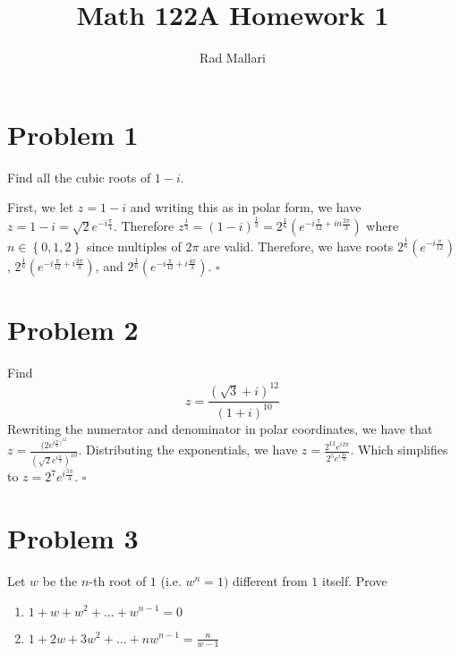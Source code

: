 \documentclass[12pt]{article}
\title{Math 122A Homework 1}
\author{Rad Mallari}
\newcommand{\set}[1]{\left\{ #1\right\}}
\newenvironment{proof}{\noindent{\bf Proof.}}{\hfill $\square$\medskip}
\begin{document}
\maketitle

\section{Problem 1}
Find all the cubic roots of $1-i$.

\begin{proof}
First, we let $z=1-i$ and writing this as in polar form, we have $z=1-i=\sqrt{2}e^{-i\frac{\pi}{4}}$. Therefore $z^\frac{1}{3}=(1-i)^{\frac{1}{3}}=2^{\frac{1}{6}}(e^{-i\frac{\pi}{12}+in\frac{2\pi}{3}})$ where $n\in\set{0,1,2}$ since multiples of $2\pi$ are valid. Therefore, we have roots
$2^{\frac{1}{6}}(e^{-i\frac{\pi}{12}})$,
$2^{\frac{1}{6}}(e^{-i\frac{\pi}{12}+i\frac{2\pi}{3}})$, and $2^{\frac{1}{6}}(e^{-i\frac{\pi}{12}+i\frac{4\pi}{3}})$.
\end{proof}


\section{Problem 2}
Find
$$z=\frac{(\sqrt{3}+i)^{12}}{(1+i)^{10}}$$
\begin{proof}
Rewriting the numerator and denominator in polar coordinates, we have that $z=\frac{(2e^{i\frac{\pi}{6})^{12}}}{(\sqrt{2}e^{i\frac{\pi}{4}})^{10}}$. Distributing the exponentials, we have $z=\frac{2^{12}e^{i2\pi}}{2^{5}e^{i\frac{3\pi}{4}}}$. Which simplifies to $z=2^{7}e^{i\frac{5\pi}{4}}$.
\end{proof}


\section{Problem 3}
Let $w$ be the $n$-th root of $1$ (i.e. $w^{n}=1)$ different from $1$ itself. Prove
\begin{enumerate}[label=\textbf{(\alph*)}]
    \item $1+w+w^{2}+...+w^{n-1}=0$
    \item $1+2w+3w^{2}+...+nw^{n-1}=\frac{n}{w-1}$
\end{enumerate}
\end{document}
